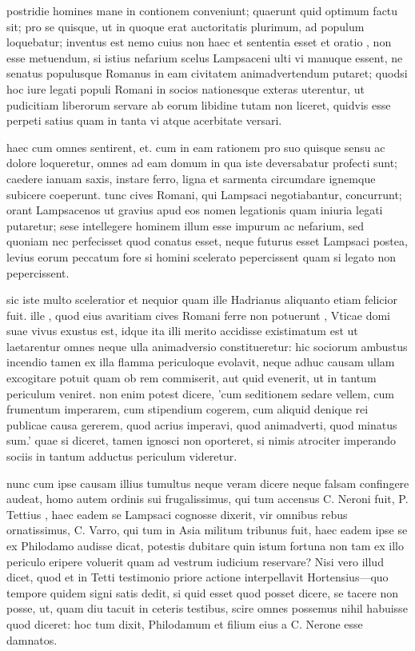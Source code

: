 postridie homines mane in contionem conveniunt; quaerunt quid optimum factu sit; pro se quisque, ut in quoque erat auctoritatis plurimum, ad populum loquebatur; inventus est nemo cuius non haec et sententia esset et oratio , non esse metuendum, si istius nefarium scelus Lampsaceni ulti vi manuque essent, ne senatus populusque Romanus in eam civitatem animadvertendum putaret; quodsi hoc iure legati populi Romani in socios nationesque exteras uterentur, ut pudicitiam liberorum servare ab eorum libidine tutam non liceret, quidvis esse perpeti satius quam in tanta vi atque acerbitate versari.

 haec cum omnes sentirent, et. cum in eam rationem pro suo quisque sensu ac dolore loqueretur, omnes ad eam domum in qua iste deversabatur profecti sunt; caedere ianuam saxis, instare ferro, ligna et sarmenta circumdare ignemque subicere coeperunt. tunc cives Romani, qui Lampsaci negotiabantur, concurrunt; orant Lampsacenos ut gravius apud eos nomen legationis quam iniuria legati putaretur; sese intellegere hominem illum esse impurum ac nefarium, sed quoniam nec perfecisset quod conatus esset, neque futurus esset Lampsaci postea, levius eorum peccatum fore si homini scelerato pepercissent quam si legato non pepercissent.

 sic iste multo sceleratior et nequior quam ille Hadrianus aliquanto etiam felicior fuit. ille , quod eius avaritiam cives Romani ferre non potuerunt , Vticae domi suae vivus exustus est, idque ita illi merito accidisse existimatum est ut laetarentur omnes neque ulla animadversio constitueretur: hic sociorum ambustus incendio tamen ex illa flamma periculoque evolavit, neque adhuc causam ullam excogitare potuit quam ob rem commiserit, aut quid evenerit, ut in tantum periculum veniret. non enim potest dicere, 'cum seditionem sedare vellem, cum frumentum imperarem, cum stipendium cogerem, cum aliquid denique rei publicae causa gererem, quod acrius imperavi, quod animadverti, quod minatus sum.' quae si diceret, tamen ignosci non oporteret, si nimis atrociter imperando sociis in tantum adductus periculum videretur.

 nunc cum ipse causam illius tumultus neque veram dicere neque falsam confingere audeat, homo autem ordinis sui frugalissimus, qui tum accensus C. Neroni fuit, P. Tettius , haec eadem se Lampsaci cognosse dixerit, vir omnibus rebus ornatissimus, C. Varro, qui tum in Asia militum tribunus fuit, haec eadem ipse se ex Philodamo audisse dicat, potestis dubitare quin istum fortuna non tam ex illo periculo eripere voluerit quam ad vestrum iudicium reservare? Nisi vero illud dicet, quod et in Tetti testimonio priore actione interpellavit Hortensius—quo tempore quidem signi satis dedit, si quid esset quod posset dicere, se tacere non posse, ut, quam diu tacuit in ceteris testibus, scire omnes possemus nihil habuisse quod diceret: hoc tum dixit, Philodamum et filium eius a C. Nerone esse damnatos.

